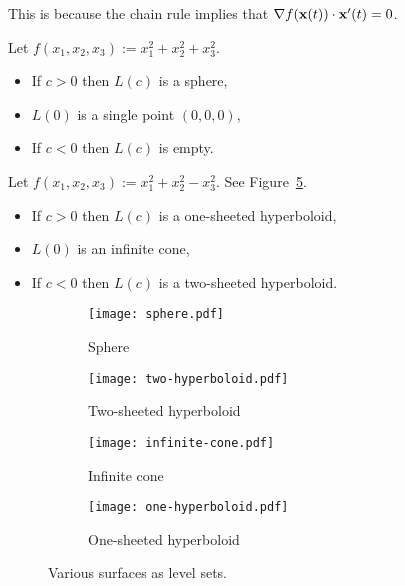 This is because the chain rule implies that \(\nabla f(\mathbf{x}(t)) \cdot \mathbf{x}'(t) = 0\).
\begin{example*}
    Let \(f(x_1,x_2,x_3):=x_1^2 + x_2^2 + x_3^2\).
    \begin{itemize}
        \item If \(c>0\) then \(L(c)\) %
              is a sphere,
        \item \(L(0) \) is a single point \((0,0,0)\),
        \item If \(c<0\) then \(L(c)\) is empty.
    \end{itemize}
\end{example*}

\begin{example*}
    Let \(f(x_1,x_2,x_3):=x_1^2 + x_2^2 - x_3^2\).
    See Figure~\ref{fig:level-sets}.
    \begin{itemize}
        \item If \(c>0\) then \(L(c)\) is a one-sheeted hyperboloid,
        \item \(L(0) \) is an infinite cone,
        \item If \(c<0\) then \(L(c)\) is a two-sheeted hyperboloid.
    \end{itemize}
\end{example*}

\begin{figure}[htb]
    \begin{center}
        \begin{subfigure}[b]{0.24\textwidth}
            \centering
            \texttt{[image: sphere.pdf]}
            \caption{Sphere}
            \label{fig:sphere}
        \end{subfigure}
        \hfill
        \begin{subfigure}[b]{0.24\textwidth}
            \centering
            \texttt{[image: two-hyperboloid.pdf]}
            \caption{Two-sheeted hyperboloid}
            \label{fig:two-hyperboloid}
        \end{subfigure}
        \hfill
        \begin{subfigure}[b]{0.24\textwidth}
            \centering
            \texttt{[image: infinite-cone.pdf]}
            \caption{Infinite cone}
            \label{fig:infinite-cone}
        \end{subfigure}
        \hfill
        \begin{subfigure}[b]{0.24\textwidth}
            \centering
            \texttt{[image: one-hyperboloid.pdf]}
            \caption{One-sheeted hyperboloid}
            \label{fig:one-hyperboloid}
        \end{subfigure}
        \caption{Various surfaces as level sets.}
        \label{fig:level-sets}
    \end{center}
\end{figure}


